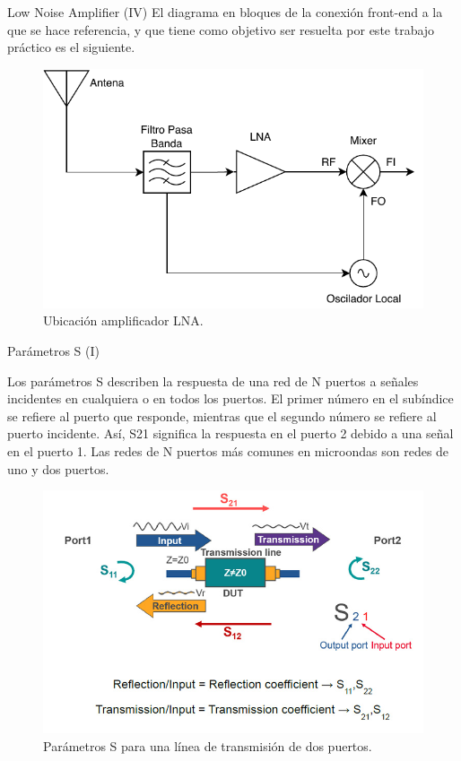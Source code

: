 \documentclass[9pt]{beamer}
\begin{document}
	\begin{frame}{Low Noise Amplifier (IV)}
		El diagrama en bloques de la conexión front-end a la que se hace referencia, y que tiene como objetivo ser resuelta por este trabajo práctico es el siguiente.

		\begin{figure}
			\centering
			\includegraphics[width=0.7\linewidth]{img/lna_front}
			\caption{Ubicación amplificador LNA.}
			\label{fig:lnafront}
		\end{figure}		
	\end{frame}
	
	\begin{frame}{Parámetros S (I)}
		
		Los parámetros S describen la respuesta de una red de N puertos a señales incidentes en cualquiera o en todos los puertos. El primer número en el subíndice se refiere al puerto que responde, mientras que el segundo número se refiere al puerto incidente. Así, S21 significa la respuesta en el puerto 2 debido a una señal en el puerto 1. Las redes de N puertos más comunes en microondas son redes de uno y dos puertos.
		
		\begin{figure}
			\centering
			\includegraphics[width=0.5\linewidth]{img/s_params_img}
			\caption {Parámetros S para una línea de transmisión de dos puertos.}
			\label{fig:sparamsimg}
		\end{figure}
		
	\end{frame}
	
\end{document}
